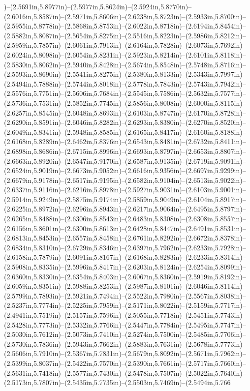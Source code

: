 )--(2.5691in,5.8977in)--(2.5977in,5.8624in)--(2.5924in,5.8770in)--(2.6016in,5.8587in)--(2.5971in,5.8606in)--(2.6238in,5.8723in)--(2.5933in,5.8700in)--(2.5955in,5.8778in)--(2.5868in,5.8753in)--(2.6022in,5.8718in)--(2.6194in,5.8454in)--(2.5882in,5.8087in)--(2.5654in,5.8275in)--(2.5516in,5.8223in)--(2.5986in,5.8212in)--(2.5959in,5.7857in)--(2.6061in,5.7913in)--(2.6164in,5.7828in)--(2.6073in,5.7692in)--(2.6024in,5.8098in)--(2.6054in,5.8231in)--(2.5923in,5.8214in)--(2.6101in,5.8118in)--(2.5830in,5.8062in)--(2.5940in,5.8428in)--(2.5674in,5.8548in)--(2.5748in,5.8716in)--(2.5593in,5.8690in)--(2.5541in,5.8275in)--(2.5380in,5.8133in)--(2.5343in,5.7997in)--(2.5494in,5.7888in)--(2.5744in,5.8018in)--(2.5778in,5.7843in)--(2.5743in,5.7942in)--(2.5576in,5.7751in)--(2.5606in,5.7684in)--(2.5545in,5.7586in)--(2.5632in,5.7577in)--(2.5736in,5.7531in)--(2.5852in,5.7745in)--(2.5856in,5.8008in)--(2.6000in,5.8115in)--(2.6257in,5.8545in)--(2.6048in,5.8693in)--(2.6103in,5.8747in)--(2.6170in,5.8728in)--(2.6290in,5.8591in)--(2.6046in,5.8282in)--(2.6293in,5.8380in)--(2.6270in,5.8520in)--(2.6049in,5.8341in)--(2.5948in,5.8585in)--(2.6165in,5.8417in)--(2.6160in,5.8188in)--(2.6168in,5.8289in)--(2.6462in,5.8376in)--(2.6543in,5.8481in)--(2.6732in,5.8411in)--(2.6898in,5.8686in)--(2.6715in,5.8996in)--(2.6693in,5.8797in)--(2.6653in,5.8807in)--(2.6663in,5.8920in)--(2.6547in,5.9170in)--(2.6587in,5.9135in)--(2.6719in,5.9091in)--(2.6524in,5.9019in)--(2.6673in,5.9052in)--(2.6616in,5.9356in)--(2.6697in,5.9299in)--(2.6679in,5.9178in)--(2.6517in,5.9195in)--(2.6582in,5.9104in)--(2.6513in,5.9022in)--(2.6337in,5.9116in)--(2.6216in,5.8978in)--(2.5927in,5.9031in)--(2.6103in,5.9001in)--(2.5914in,5.9249in)--(2.5875in,5.9174in)--(2.5859in,5.9049in)--(2.6104in,5.8917in)--(2.6225in,5.8972in)--(2.6296in,5.8943in)--(2.6217in,5.9064in)--(2.6495in,5.8797in)--(2.6265in,5.8488in)--(2.6306in,5.8543in)--(2.6483in,5.8308in)--(2.6308in,5.8557in)--(2.6156in,5.8601in)--(2.6300in,5.8613in)--(2.6428in,5.8447in)--(2.6491in,5.8531in)--(2.6813in,5.8453in)--(2.6557in,5.8458in)--(2.6761in,5.8292in)--(2.6672in,5.8378in)--(2.6834in,5.8310in)--(2.6729in,5.8346in)--(2.6397in,5.7962in)--(2.6233in,5.7928in)--(2.6158in,5.7879in)--(2.6091in,5.8167in)--(2.6168in,5.8283in)--(2.6233in,5.8314in)--(2.5908in,5.8335in)--(2.5996in,5.8417in)--(2.6203in,5.8124in)--(2.6254in,5.8099in)--(2.6360in,5.8330in)--(2.6354in,5.8403in)--(2.6067in,5.8360in)--(2.5919in,5.8192in)--(2.6059in,5.8351in)--(2.5988in,5.8253in)--(2.5987in,5.8101in)--(2.6046in,5.8114in)--(2.5799in,5.7893in)--(2.5921in,5.7494in)--(2.5522in,5.7980in)--(2.5567in,5.8038in)--(2.5237in,5.7774in)--(2.5225in,5.7959in)--(2.5171in,5.8022in)--(2.5159in,5.7717in)--(2.4941in,5.7519in)--(2.5157in,5.7596in)--(2.5055in,5.7718in)--(2.5451in,5.7743in)--(2.5428in,5.7773in)--(2.5332in,5.7766in)--(2.5447in,5.7784in)--(2.5495in,5.7747in)--(2.5030in,5.7612in)--(2.5073in,5.7410in)--(2.5274in,5.7500in)--(2.5485in,5.7706in)--(2.5730in,5.7836in)--(2.5943in,5.7662in)--(2.5883in,5.7631in)--(2.5678in,5.7773in)--(2.5606in,5.7910in)--(2.5367in,5.7831in)--(2.5679in,5.8092in)--(2.5671in,5.7962in)--(2.5399in,5.8037in)--(2.5422in,5.7570in)--(2.5390in,5.7661in)--(2.5717in,5.7660in)--(2.5631in,5.7418in)--(2.5577in,5.7430in)--(2.5478in,5.7507in)--(2.5022in,5.7640in)--(2.5173in,5.7807in)--(2.5435in,5.7735in)--(2.5503in,5.7469in)--(2.5494in,5.766